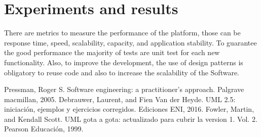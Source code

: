 \documentclass[conference]{IEEEtran}
\begin{document}
\section{Experiments and results}
There are metrics to measure the performance of the platform, those can be response time, speed, scalability, capacity, and application stability. To guarantee the good performance the majority of tests are unit test for each new functionality. Also, to improve the development, the use of design patterns is obligatory to reuse code and also to increase the scalability of the Software.



\begin{thebibliography}{00}
 Pressman, Roger S. Software engineering: a practitioner's approach. Palgrave macmillan, 2005.
 Debrauwer, Laurent, and Fien Van der Heyde. UML 2.5: iniciación, ejemplos y ejercicios corregidos. Ediciones ENI, 2016.
 Fowler, Martin, and Kendall Scott. UML gota a gota: actualizado para cubrir la version 1. Vol. 2. Pearson Educación, 1999.
\end{thebibliography}
\end{document}
